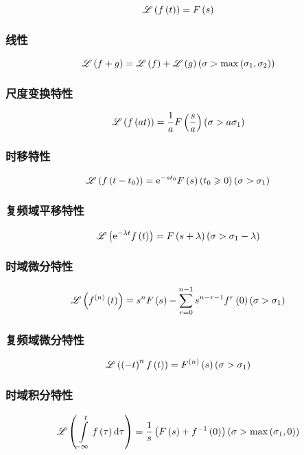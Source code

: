 \documentclass{article}
\begin{document}
\[\mathscr L\left(f\left(t\right)\right)=F\left(s\right)\]

\subsubsection{线性}

\[\mathscr L\left(f+g\right)=\mathscr L\left(f\right)+\mathscr L\left(g\right)
    \left(\sigma>\max\left(\sigma_1,\sigma_2\right)\right)\]

\subsubsection{尺度变换特性}

\[\mathscr L\left(f\left(at\right)\right)=\frac1aF\left(\frac sa\right)
    \left(\sigma>a\sigma_1\right)\]

\subsubsection{时移特性}

\[\mathscr L\left(f\left(t-t_0\right)\right)=\mathrm e^{-st_0}F\left(s\right)\left(t_0\geqslant0\right)
    \left(\sigma>\sigma_1\right)\]

\subsubsection{复频域平移特性}

\[\mathscr L\left(\mathrm e^{-\lambda t}f\left(t\right)\right)=F\left(s+\lambda\right)
    \left(\sigma>\sigma_1-\lambda\right)\]

\subsubsection{时域微分特性}

\[\mathscr L\left(f^{\left(n\right)}\left(t\right)\right)=s^nF\left(s\right)-\sum_{r=0}^{n-1}s^{n-r-1}f^r\left(0\right)
    \left(\sigma>\sigma_1\right)\]

\subsubsection{复频域微分特性}

\[\mathscr L\left(\left(-t\right)^nf\left(t\right)\right)=F^{\left(n\right)}\left(s\right)
    \left(\sigma>\sigma_1\right)\]

\subsubsection{时域积分特性}

\[\mathscr L\left(\int\limits_{-\infty}^tf\left(\tau\right)\mathrm d\tau\right)=
    \frac1s\left(F\left(s\right)+f^{-1}\left(0\right)\right)
    \left(\sigma>\max\left(\sigma_1,0\right)\right)\]
\end{document}
